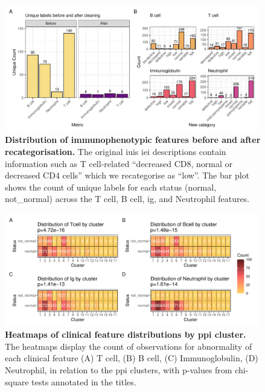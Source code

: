 \begin{figure}[h]
  \centering
  \includegraphics[width=0.99\textwidth]{../images/plot_patch1.pdf}
  \caption{ \textbf{Distribution of immunophenotypic features before and after recategorisation.}
  The original \ac{iuis} \ac{iei} descriptions contain information such as T cell-related
  ``decreased CD8, normal or decreased CD4 cells'' which we recategorise as ``low''.
  The bar plot shows the count of unique labels for each status (normal, not\_normal) across the T cell, B cell, \ac{ig}, and Neutrophil features.}
  \label{fig:immunophenotype_before_after}
\end{figure}

\begin{figure}[h]
  \centering
  \includegraphics[width=0.99\textwidth]{../images/plot_multicat_patch_3_clust_chi.pdf}
  \caption{\textbf{Heatmaps of clinical feature distributions by \ac{ppi} cluster.} The heatmaps display the count of observations for abnormality of each clinical feature (A) T cell, (B) B cell, (C) Immunoglobulin, (D) Neutrophil, in relation to the \ac{ppi} clusters, with p-values from chi-square tests annotated in the titles.}
  \label{fig:plot_multicat_patch_3_clust_chi}
\end{figure}

